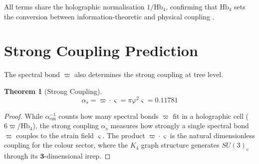 \documentclass[11pt,a4paper]{article}
\newtheorem{theorem}{Theorem}[section]
\theoremstyle{definition}
\newcommand{\Hbfour}{\mathrm{Hb}_4}
\newcommand{\gs}{\varsigma}
\begin{document}
All terms share the holographic normalisation $1/\Hbfour$, confirming that $\Hbfour$ sets the conversion between information-theoretic and physical coupling \cite{Almheiri2015,Pastawski2015,Hubka2025DCT}.

\section{Strong Coupling Prediction}
\label{sec:alpha_s}

The spectral bond $\varpi$ also determines the strong coupling at tree level.

\begin{theorem}[Strong Coupling]
\label{thm:alpha_s}
\begin{equation}
\alpha_s = \varpi \cdot \gs = \pi\varphi^2\gs = 0.11781
\label{eq:alpha_s}
\end{equation}
\end{theorem}

\begin{proof}
While $\alpha^{-1}_{\text{em}}$ counts how many spectral bonds $\varpi$ fit in a holographic cell ($6\varpi/\Hbfour$), the strong coupling $\alpha_s$ measures how strongly a single spectral bond $\varpi$ couples to the strain field $\gs$. The product $\varpi \cdot \gs$ is the natural dimensionless coupling for the colour sector, where the $K_4$ graph structure generates $SU(3)_c$ through its $\mathbf{3}$-dimensional irrep.
\end{proof}
\end{document}
